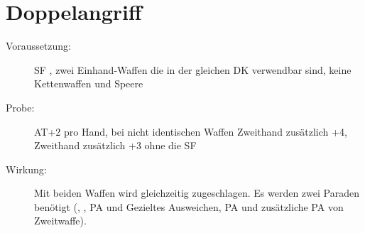 \section{Doppelangriff}
\label{bAT.doppelangriff}
\begin{description}
    \item[Voraussetzung:]
        SF , zwei Einhand-Waffen die in der gleichen DK verwendbar sind, keine Kettenwaffen und Speere
    \item[Probe:]
        AT+2 pro Hand, bei nicht identischen Waffen Zweithand zusätzlich +4, Zweithand zusätzlich +3 ohne die SF 
    \item[Wirkung:]
        Mit beiden Waffen wird gleichzeitig zugeschlagen.
        Es werden zwei Paraden benötigt (, , PA und Gezieltes Ausweichen, PA und zusätzliche PA von Zweitwaffe).
\end{description}

